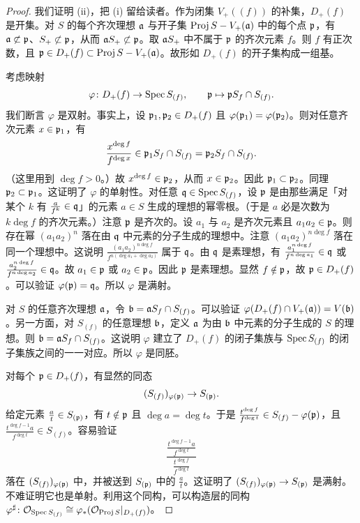 \begin{proof}
我们证明 (ii)，把 (i) 留给读者。作为闭集 $V_+((f))$ 的补集，$D_+(f)$ 是开集。对 $S$ 的每个齐次理想 $\mathfrak{a}$ 与开子集 $\operatorname{Proj} S-V_+(\mathfrak{a})$ 中的每个点 $\mathfrak{p}$，有 $\mathfrak{a}\not\subset\mathfrak{p}$、$S_+\not\subset\mathfrak{p}$，从而 $\mathfrak{a} S_+\not\subset\mathfrak{p}$。取 $\mathfrak{a} S_+$ 中不属于 $\mathfrak{p}$ 的齐次元素 $f$。则 $f$ 有正次数，且 $\mathfrak{p}\in D_+(f)\subset\operatorname{Proj} S-V_+(\mathfrak{a})$。故形如 $D_+(f)$ 的开子集构成一组基。

考虑映射
\[
\varphi\colon D_+(f)\to\operatorname{Spec} S_{(f)},\qquad \mathfrak{p}\mapsto \mathfrak{p} S_f\cap S_{(f)}.
\]
我们断言 $\varphi$ 是双射。事实上，设 $\mathfrak{p}_1,\mathfrak{p}_2\in D_+(f)$ 且 $\varphi(\mathfrak{p}_1)=\varphi(\mathfrak{p}_2)$。则对任意齐次元素 $x\in\mathfrak{p}_1$，有
\[
\frac{x^{\deg f}}{f^{\deg x}}\in\mathfrak{p}_1S_f\cap S_{(f)}=\mathfrak{p}_2S_f\cap S_{(f)}.
\]
（这里用到 $\deg f>0$。）故 $x^{\deg f}\in\mathfrak{p}_2$，从而 $x\in\mathfrak{p}_2$。因此 $\mathfrak{p}_1\subset\mathfrak{p}_2$。同理 $\mathfrak{p}_2\subset\mathfrak{p}_1$。这证明了 $\varphi$ 的单射性。对任意 $\mathfrak{q}\in\operatorname{Spec} S_{(f)}$，设 $\mathfrak{p}$ 是由那些满足「对某个 $k$ 有 $\frac{a}{f^k}\in\mathfrak{q}$」的元素 $a\in S$ 生成的理想的幂零根。（于是 $a$ 必是次数为 $k\deg f$ 的齐次元素。）注意 $\mathfrak{p}$ 是齐次的。设 $a_1$ 与 $a_2$ 是齐次元素且 $a_1a_2\in\mathfrak{p}$。则存在幂 $(a_1a_2)^n$ 落在由 $\mathfrak{q}$ 中元素的分子生成的理想中。注意 $(a_1a_2)^{n\deg f}$ 落在同一个理想中。这说明 $\frac{(a_1a_2)^{n\deg f}}{f^{n(\deg a_1+\deg a_2)}}$ 属于 $\mathfrak{q}$。由 $\mathfrak{q}$ 是素理想，有 $\frac{a_1^{n\deg f}}{f^{n\deg a_1}}\in\mathfrak{q}$ 或 $\frac{a_2^{n\deg f}}{f^{n\deg a_2}}\in\mathfrak{q}$。故 $a_1\in\mathfrak{p}$ 或 $a_2\in\mathfrak{p}$。因此 $\mathfrak{p}$ 是素理想。显然 $f\notin\mathfrak{p}$，故 $\mathfrak{p}\in D_+(f)$。可以验证 $\varphi(\mathfrak{p})=\mathfrak{q}$。所以 $\varphi$ 是满射。

对 $S$ 的任意齐次理想 $\mathfrak{a}$，令 $\mathfrak{b}=\mathfrak{a} S_f\cap S_{(f)}$。可以验证 $\varphi(D_+(f)\cap V_+(\mathfrak{a}))=V(\mathfrak{b})$。另一方面，对 $S_{(f)}$ 的任意理想 $\mathfrak{b}$，定义 $\mathfrak{a}$ 为由 $\mathfrak{b}$ 中元素的分子生成的 $S$ 的理想。则 $\mathfrak{b}=\mathfrak{a} S_f\cap S_{(f)}$。这说明 $\varphi$ 建立了 $D_+(f)$ 的闭子集族与 $\operatorname{Spec} S_{(f)}$ 的闭子集族之间的一一对应。所以 $\varphi$ 是同胚。

对每个 $\mathfrak{p}\in D_+(f)$，有显然的同态
\[
(S_{(f)})_{\varphi(\mathfrak{p})}\to S_{(\mathfrak{p})}.
\]
给定元素 $\frac{a}{t}\in S_{(\mathfrak{p})}$，有 $t\notin\mathfrak{p}$ 且 $\deg a=\deg t$。于是 $\frac{t^{\deg f}}{f^{\deg t}}\in S_{(f)}-\varphi(\mathfrak{p})$，且 $\frac{t^{\deg f-1}a}{f^{\deg t}}\in S_{(f)}$。容易验证
\[
\frac{\frac{t^{\deg f-1}a}{f^{\deg t}}}{\frac{t^{\deg f}}{f^{\deg t}}}
\]
落在 $(S_{(f)})_{\varphi(\mathfrak{p})}$ 中，并被送到 $S_{(\mathfrak{p})}$ 中的 $\frac{a}{t}$。这证明了 $(S_{(f)})_{\varphi(\mathfrak{p})}\to S_{(\mathfrak{p})}$ 是满射。不难证明它也是单射。利用这个同构，可以构造层的同构 $\varphi^\sharp\colon\mathcal{O}_{\operatorname{Spec} S_{(f)}}\cong\varphi_*(\mathcal{O}_{\operatorname{Proj} S}|_{D_+(f)})$。
\end{proof}

